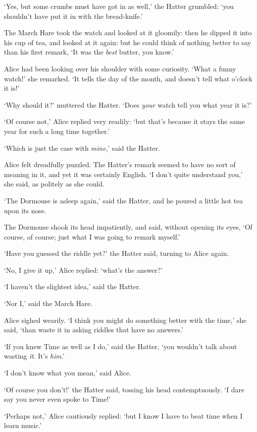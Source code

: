   `Yes, but some crumbs must have got in as well,' the Hatter
grumbled:  `you shouldn't have put it in with the bread-knife.'

  The March Hare took the watch and looked at it gloomily:  then
he dipped it into his cup of tea, and looked at it again:  but he
could think of nothing better to say than his first remark, `It
was the {\it best} butter, you know.'

  Alice had been looking over his shoulder with some curiosity.
`What a funny watch!' she remarked.  `It tells the day of the
month, and doesn't tell what o'clock it is!'

  `Why should it?' muttered the Hatter.  `Does {\it your} watch tell
you what year it is?'

  `Of course not,' Alice replied very readily:  `but that's
because it stays the same year for such a long time together.'

  `Which is just the case with {\it mine},' said the Hatter.

  Alice felt dreadfully puzzled.  The Hatter's remark seemed to
have no sort of meaning in it, and yet it was certainly English.
`I don't quite understand you,' she said, as politely as she
could.

  `The Dormouse is asleep again,' said the Hatter, and he poured
a little hot tea upon its nose.

  The Dormouse shook its head impatiently, and said, without
opening its eyes, `Of course, of course; just what I was going to
remark myself.'

  `Have you guessed the riddle yet?' the Hatter said, turning to
Alice again.

  `No, I give it up,' Alice replied:  `what's the answer?'

  `I haven't the slightest idea,' said the Hatter.

  `Nor I,' said the March Hare.

  Alice sighed wearily.  `I think you might do something better
with the time,' she said, `than waste it in asking riddles that
have no answers.'

  `If you knew Time as well as I do,' said the Hatter, `you
wouldn't talk about wasting {\it it}.  It's {\it him}.'

  `I don't know what you mean,' said Alice.

  `Of course you don't!' the Hatter said, tossing his head
contemptuously.  `I dare say you never even spoke to Time!'

  `Perhaps not,' Alice cautiously replied:  `but I know I have to
beat time when I learn music.'

